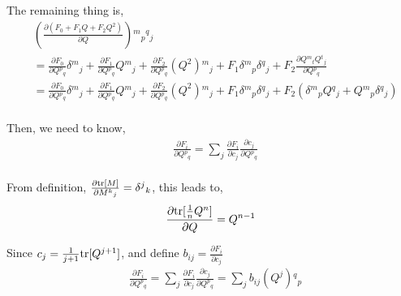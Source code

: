 The remaining thing is,
\begin{equation}
\begin{split}
&\left(\frac{\partial \left(F_0+F_1Q+F_2Q^2\right)}{\partial Q}\right) {}^m{}_p{}^q{}_j\\
&=\frac{\partial F_0}{\partial Q{}^p{}_q}\delta {}^m{}_j + \frac{\partial F_1}{\partial Q{}^p{}_q} Q{}^m{}_j + \frac{\partial F_2}{\partial Q{}^p{}_q} (Q^2){}^m{}_j + F_1 \delta {}^m{}_p \delta {}^q{}_j + F_2 \frac{\partial Q{}^m{}_t Q{}^t{}_j}{\partial Q{}^p{}_q}\\
&=\frac{\partial F_0}{\partial Q{}^p{}_q}\delta {}^m{}_j + \frac{\partial F_1}{\partial Q{}^p{}_q} Q{}^m{}_j + \frac{\partial F_2}{\partial Q{}^p{}_q} (Q^2){}^m{}_j + F_1 \delta {}^m{}_p \delta {}^q{}_j + F_2 \left(\delta {}^m{}_pQ{}^q{}_j+Q {}^m{}_p\delta {}^q{}_j\right)\\
\end{split}
\end{equation}

Then, we need to know,
\begin{equation}
\begin{split}
&\frac{\partial F_i}{\partial Q{}^p{}_q} = \sum _j \frac{\partial F_i}{\partial c_j}\frac{\partial c_j}{\partial Q{}^p{}_q}\\
\end{split}
\end{equation}

\begin{tcolorbox}

From definition, $\frac{\partial {\rm tr}[M]}{\partial M{}^k{}_j} = \delta {}^j{}_k$, this leads to,
\begin{equation}
\begin{split}
&\frac{\partial {\rm tr}[\frac{1}{n}Q^n]}{\partial Q} = Q^{n-1}\\
\end{split}
\end{equation}

\end{tcolorbox}

Since $c_j = \frac{1}{j+1}{\rm tr}[Q^{j+1}]$, and define $b_{ij} = \frac{\partial F_i}{\partial c_j}$
\begin{equation}
\begin{split}
&\frac{\partial F_i}{\partial Q{}^p{}_q} = \sum _j \frac{\partial F_i}{\partial c_j}\frac{\partial c_j}{\partial Q{}^p{}_q} = \sum _j b_{ij} (Q^j) {}^q{}_p\\
\end{split}
\end{equation}

